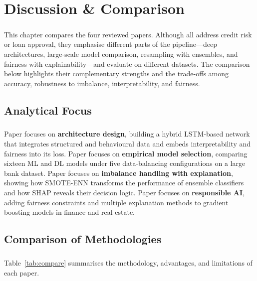 \documentclass[12pt,a4paper,final]{extreport}
\begin{document}
\chapter{Discussion \& Comparison}

\paragraph{} This chapter compares the four reviewed papers. Although all address credit risk or loan approval, they emphasise different parts of the pipeline---deep architectures, large-scale model comparison, resampling with ensembles, and fairness with explainability---and evaluate on different datasets. The comparison below highlights their complementary strengths and the trade-offs among accuracy, robustness to imbalance, interpretability, and fairness.

\section{Analytical Focus}

\paragraph{} Paper \cite{p1} focuses on \textbf{architecture design}, building a hybrid LSTM-based network that integrates structured and behavioural data and embeds interpretability and fairness into its loss. Paper \cite{p2} focuses on \textbf{empirical model selection}, comparing sixteen ML and DL models under five data-balancing configurations on a large bank dataset. Paper \cite{p3} focuses on \textbf{imbalance handling with explanation}, showing how SMOTE-ENN transforms the performance of ensemble classifiers and how SHAP reveals their decision logic. Paper \cite{p4} focuses on \textbf{responsible AI}, adding fairness constraints and multiple explanation methods to gradient boosting models in finance and real estate.

\section{Comparison of Methodologies}

\paragraph{} Table~\ref{tab:compare} summarises the methodology, advantages, and limitations of each paper.
\end{document}
